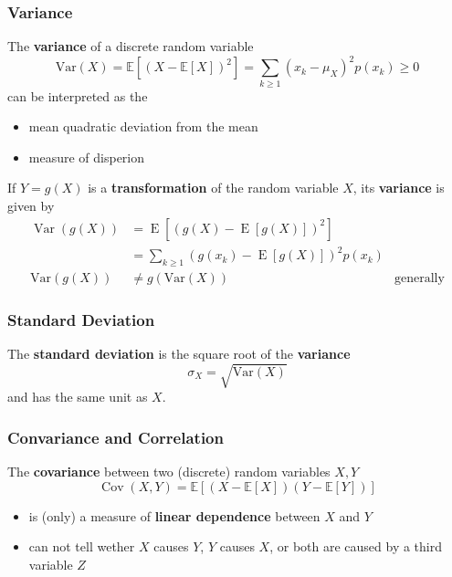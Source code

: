 \subsubsection{Variance}
The \textbf{variance} of a discrete random variable
\noindent\begin{equation*}
    \mathrm{Var}(X) = \mathbb{E}[{(X-\mathbb{E}[X])}^2] = \sum_{k\geq1}{(x_k-\mu_X)}^2p(x_k)\geq0
\end{equation*}
can be interpreted as the
\begin{itemize}
    \item mean quadratic deviation from the mean
    \item measure of disperion
\end{itemize}

\newpar{}
If $Y=g(X)$ is a \textbf{transformation} of the random variable $X$, its \textbf{variance} is given by
\noindent\begin{align*}
    \operatorname{Var}(g(X)) & =\operatorname{E}[(g(X)-\operatorname{E}[g(X)])^{2}]                           \\
                             & =\sum_{k\geq1}(g(x_{k})-\operatorname{E}[g(X)])^{2}p(x_{k})                    \\
    \mathrm{Var}(g(X))       & \neq g(\mathrm{Var}(X))                                     & \text{generally}
\end{align*}

\subsubsection{Standard Deviation}
The \textbf{standard deviation} is the square root of the \textbf{variance}
\noindent\begin{equation*}
    \sigma_{X}=\sqrt{\mathrm{Var}(X)}
\end{equation*}
and has the same unit as $X$.

\subsubsection{Convariance and Correlation}
The \textbf{covariance} between two (discrete) random variables $X,Y$
\noindent\begin{equation*}
    \operatorname{Cov}(X,Y)=\mathbb{E}[(X-\mathbb{E}[X])(Y-\mathbb{E}[Y])]
\end{equation*}
\begin{itemize}
    \item is (only) a measure of \textbf{linear dependence} between $X$ and $Y$
    \item can not tell wether $X$ causes $Y$, $Y$ causes $X$, or both are caused by a third variable $Z$
\end{itemize}


